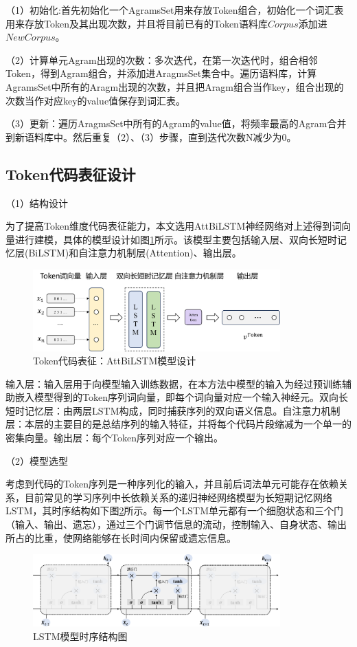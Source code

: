（1）初始化:首先初始化一个AgramsSet用来存放Token组合，初始化一个词汇表用来存放Token及其出现次数，并且将目前已有的Token语料库$Corpus$添加进$NewCorpus$。

（2）计算单元Agram出现的次数：多次迭代，在第一次迭代时，组合相邻Token，得到Agram组合，并添加进AragmsSet集合中。遍历语料库，计算AgramsSet中所有的Aragm出现的次数，并且把Aragm组合当作key，组合出现的次数当作对应key的value值保存到词汇表。

（3）更新：遍历AragmsSet中所有的Agram的value值，将频率最高的Agram合并到新语料库中。然后重复（2）、（3）步骤，直到迭代次数N减少为0。

\subsection{Token代码表征设计}
\label{subsec:TokenModel}
（1）结构设计

为了提高Token维度代码表征能力，本文选用AttBiLSTM神经网络对上述得到词向量进行建模，具体的模型设计如图\ref{fig:tokenmodel}所示。该模型主要包括输入层、双向长短时记忆层(BiLSTM)和自注意力机制层(Attention)、输出层。
\begin{figure}[H]
  \centering
  \includegraphics[width=0.85\textwidth]{figures/tokenmodel}
  \caption{Token代码表征：AttBiLSTM模型设计}\label{fig:tokenmodel}
\end{figure}

输入层：输入层用于向模型输入训练数据，在本方法中模型的输入为经过预训练辅助嵌入模型得到的Token序列词向量，即每个词向量对应一个输入神经元。双向长短时记忆层：由两层LSTM构成，同时捕获序列的双向语义信息。自注意力机制层：本层的主要目的是总结序列的输入特征，并将每个代码片段缩减为一个单一的密集向量。输出层：每个Token序列对应一个输出。

（2）模型选型

考虑到代码的Token序列是一种序列化的输入，并且前后词法单元可能存在依赖关系，目前常见的学习序列中长依赖关系的递归神经网络模型为长短期记忆网络LSTM，其时序结构如下图\ref{fig:LSTM}所示。每一个LSTM单元都有一个细胞状态和三个门（输入、输出、遗忘），通过三个门调节信息的流动，控制输入、自身状态、输出所占的比重，使网络能够在长时间内保留或遗忘信息。
\begin{figure}[H]
  \centering
  \includegraphics[width=0.85\textwidth]{figures/LSTM}
  \caption{LSTM模型时序结构图}\label{fig:LSTM}
\end{figure}

